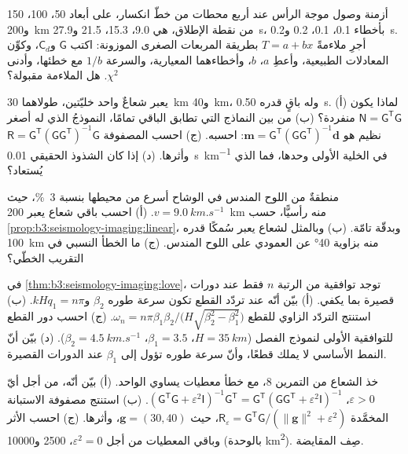 \begin{exercise}[$\star\star$]\label{exo:b3:seismology-imaging:7}
أزمنة وصول موجة الرأس عند أربع محطات من خطّ انكسار، على أبعاد 50، 100، 150
و\qty{200}{km} من نقطة الإطلاق، هي 9.0، 15.3، 21.5 و\qty{27.9}{s}، بأخطاء
0.1، 0.1، 0.2 و\qty{0.2}{s}. أجرِ ملاءمةً $T = a + bx$ بطريقة
المربعات الصغرى الموزونة: اكتب $\mathsf G$ و$\mathsf C_d$، وكوِّن المعادلات الطبيعية،
وأعطِ $a$، $b$، وأخطاءهما المعيارية، والسرعة $1/b$ مع خطئها،
وأدنى $\chi^2$. هل الملاءمة مقبولة؟
\end{exercise}

\begin{exercise}[$\star\star$]\label{exo:b3:seismology-imaging:8}
يعبر شعاعٌ واحد خليّتين، طولاهما \qty{30}{km} و\qty{40}{km}،
وله باقٍ قدره \qty{0.50}{s}. (أ) لماذا يكون $\mathsf N = \mathsf G^{\mathsf T}
\mathsf G$ منفردة؟ (ب) من بين النماذج التي تطابق الباقي تمامًا، النموذجُ
الذي له أصغر نظيم هو $\mathbf m = \mathsf G^{\mathsf T}(\mathsf G\mathsf
G^{\mathsf T})^{-1}\mathbf d$: احسبه. (ج) احسب المصفوفة
$\mathsf R = \mathsf G^{\mathsf T}(\mathsf G\mathsf G^{\mathsf T})^{-1}\mathsf G$
وأثرها. (د) إذا كان الشذوذ الحقيقي \qty{0.01}{s.km^{-1}} في الخلية
الأولى وحدها، فما الذي يُستعاد؟
\end{exercise}

\begin{exercise}[$\star\star$]\label{exo:b3:seismology-imaging:9}
منطقةٌ من اللوح المندس في الوشاح أسرع من محيطها بنسبة \qty{3}{\percent}،
حيث $v = \qty{9.0}{km.s^{-1}}$. (أ) احسب باقي شعاع يعبر
\qty{200}{km} منه رأسيًّا، حسب \cref{prop:b3:seismology-imaging:linear}،
وبدقّة تامّة. (ب) وبالمثل لشعاع يعبر سُمكًا قدره \qty{100}{km} منه بزاوية
\ang{40} عن العمودي على اللوح المندس. (ج) ما الخطأ النسبي في
التقريب الخطّي؟
\end{exercise}

\begin{exercise}[$\star\star\star$]\label{exo:b3:seismology-imaging:10}
في \cref{thm:b3:seismology-imaging:love}، توجد توافقية من الرتبة $n$ فقط
عند دورات قصيرة بما يكفي. (أ) بيّن أنّه عند تردّد القطع تكون سرعة طوره
$\beta_2$ و$kHq_1 = n\pi$. (ب) استنتج التردّد الزاوي للقطع
$\omega_n = n\pi\beta_1\beta_2/\bigl(H\sqrt{\beta_2^2 - \beta_1^2}\bigr)$.
(ج) احسب دور القطع للتوافقية الأولى لنموذج الفصل
($H = \qty{35}{km}$، $\beta_1 = 3.5$، $\beta_2 = \qty{4.5}{km.s^{-1}}$).
(د) بيّن أنّ النمط الأساسي لا يملك قطعًا، وأنّ سرعة طوره
تؤول إلى $\beta_1$ عند الدورات القصيرة.
\end{exercise}

\begin{exercise}[$\star\star\star$]\label{exo:b3:seismology-imaging:11}
خذ الشعاع من التمرين 8، مع خطأ معطيات يساوي الواحد. (أ) بيّن أنّه، من أجل أيّ
$\varepsilon > 0$، $(\mathsf G^{\mathsf T}\mathsf G + \varepsilon^2\mathsf
I)^{-1}\mathsf G^{\mathsf T} = \mathsf G^{\mathsf T}(\mathsf G\mathsf
G^{\mathsf T} + \varepsilon^2\mathsf I)^{-1}$. (ب) استنتج مصفوفة
الاستبانة المخمَّدة $\mathsf R_\varepsilon = \mathsf G^{\mathsf T}\mathsf G/(\|\mathbf g\|^2 +
\varepsilon^2)$، حيث $\mathbf g = (30, 40)$، وأثرها. (ج) احسب
الأثر وباقي المعطيات من أجل $\varepsilon^2 = 0$، 2500 و\num{10000}
(بالوحدة \unit{km^2}). صِف المقايضة.
\end{exercise}

